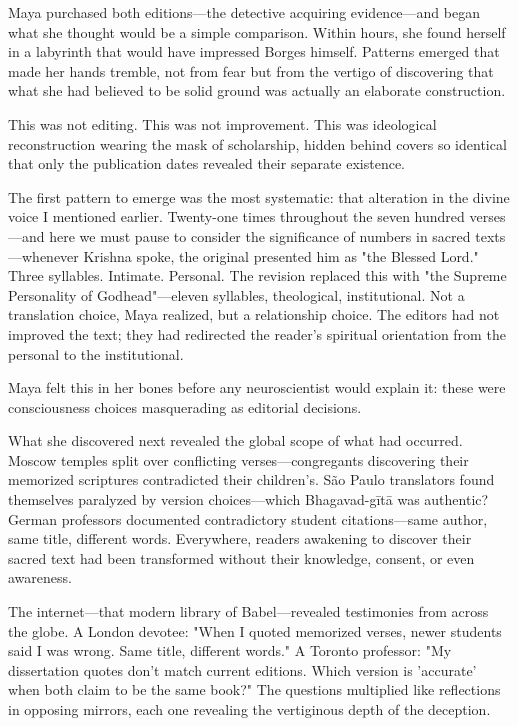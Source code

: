 \documentclass[11pt,twoside]{book}
\begin{document}
Maya purchased both editions—the detective acquiring evidence—and began what she thought would be a simple comparison. Within hours, she found herself in a labyrinth that would have impressed Borges himself. Patterns emerged that made her hands tremble, not from fear but from the vertigo of discovering that what she had believed to be solid ground was actually an elaborate construction.

This was not editing. This was not improvement. This was ideological reconstruction wearing the mask of scholarship, hidden behind covers so identical that only the publication dates revealed their separate existence.

The first pattern to emerge was the most systematic: that alteration in the divine voice I mentioned earlier. Twenty-one times throughout the seven hundred verses—and here we must pause to consider the significance of numbers in sacred texts—whenever Krishna spoke, the original presented him as "the Blessed Lord." Three syllables. Intimate. Personal. The revision replaced this with "the Supreme Personality of Godhead"—eleven syllables, theological, institutional. Not a translation choice, Maya realized, but a relationship choice. The editors had not improved the text; they had redirected the reader's spiritual orientation from the personal to the institutional.

Maya felt this in her bones before any neuroscientist would explain it: these were consciousness choices masquerading as editorial decisions.

What she discovered next revealed the global scope of what had occurred. Moscow temples split over conflicting verses—congregants discovering their memorized scriptures contradicted their children's. São Paulo translators found themselves paralyzed by version choices—which Bhagavad-gītā was authentic? German professors documented contradictory student citations—same author, same title, different words. Everywhere, readers awakening to discover their sacred text had been transformed without their knowledge, consent, or even awareness.

The internet—that modern library of Babel—revealed testimonies from across the globe. A London devotee: "When I quoted memorized verses, newer students said I was wrong. Same title, different words." A Toronto professor: "My dissertation quotes don't match current editions. Which version is 'accurate' when both claim to be the same book?" The questions multiplied like reflections in opposing mirrors, each one revealing the vertiginous depth of the deception.
\end{document}
